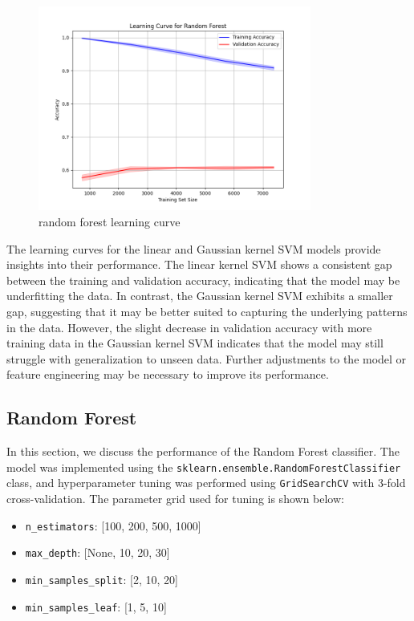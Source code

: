 \documentclass[10pt,a4paper]{article}
\begin{document}
\begin{figure}[b]
\begin{minipage}{0.2\textwidth}
        \centering
        \includegraphics[width=0.8\textwidth]{images/learning_curve_random_forest.png}
        \caption[width=0.8\linewidth]{random forest learning curve}
        \label{fig:random_forest_curve}
    \end{minipage}
\end{figure}

The learning curves  for the linear and Gaussian kernel SVM models provide insights into their performance.
The linear kernel SVM shows a consistent gap between the training and validation accuracy, indicating that the model may be underfitting the data.
In contrast, the Gaussian kernel SVM exhibits a smaller gap, suggesting that it may be better suited to capturing the underlying patterns in the data.
However, the slight decrease in validation accuracy with more training data in the Gaussian kernel SVM indicates that the model may still struggle with generalization to unseen data.
Further adjustments to the model or feature engineering may be necessary to improve its performance.


\subsection{Random Forest}

In this section, we discuss the performance of the Random Forest classifier. The model was implemented using the \texttt{sklearn.ensemble.RandomForestClassifier} class, and hyperparameter tuning was performed using \texttt{GridSearchCV} with 3-fold cross-validation. The parameter grid used for tuning is shown below:

\begin{itemize}
    \item \texttt{n\_estimators}: [100, 200, 500, 1000]
    \item \texttt{max\_depth}: [None, 10, 20, 30]
    \item \texttt{min\_samples\_split}: [2, 10, 20]
    \item \texttt{min\_samples\_leaf}: [1, 5, 10]
\end{itemize}
\end{document}
